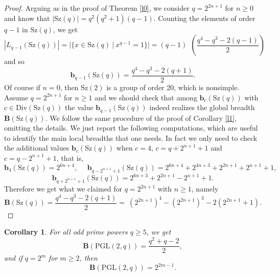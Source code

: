 \documentclass{amsart}
\newtheorem{corollary}[theorem]{Corollary}
\theoremstyle{definition}
\numberwithin{equation}{section}
\begin{document}
\begin{proof} Arguing as in the proof of Theorem \ref{l0}, we consider $q=2^{2n+1}$ for $n \ge 0$ and know that $|\mathrm{Sz}(q)|= q^2(q^2+1)(q-1)$. Counting the elements of order $q-1$ in $\mathrm{Sz}(q)$, we get
\begin{equation}
|L_{q-1}(\mathrm{Sz}(q))|=|\{x \in \mathrm{Sz}(q) \ | \ x^{q-1}=1\}|=(q-1) \ \ \left(\frac{q^4-q^3-2(q-1)}{2}\right)
\end{equation}
and so \begin{equation}\mathbf{b}_{q-1}(\mathrm{Sz}(q))=\frac{q^4-q^3-2(q+1)}{2}.
\end{equation}
Of course if $n=0$, then $\mathrm{Sz}(2)$ is a group of order 20, which is nonsimple. Assume $q=2^{2n+1}$ for $n \ge 1$ and we should check that among $\mathbf{b}_c(\mathrm{Sz}(q))$ with $c\in \mathrm{Div}(\mathrm{Sz}(q))$ the value $\mathbf{b}_{q-1}(\mathrm{Sz}(q))$ indeed realizes the global breadth $\mathbf{B}(\mathrm{Sz}(q))$. We follow the same procedure of the proof of Corollary \ref{l1}, omitting the details. We just report the following computations, which are useful to identify the main local breadths that one needs. In fact we  only need to check the additional values $\mathbf{b}_{c}(\mathrm{Sz}(q))$ when $c=4$, $c=q+2^{n+1} + 1$ and $c=q-2^{n+1} + 1$, that is, 
\begin{equation}
    \mathbf{b}_4(\mathrm{Sz}(q))=  2^{6n+4}, \ \ \ \ \ \ 
    \mathbf{b}_{q-2^{n+1}+1}(\mathrm{Sz}(q))=  2^{6n+4}+2^{4n+3}+2^{2n+1}+2^{n+1}+1,
\end{equation}  
\begin{equation}
\mathbf{b}_{q+2^{n+1} + 1}(\mathrm{Sz}(q))= 2^{6n+3}+2^{2n+1}-2^{n+1}+1.
\end{equation}
Therefore we get what we claimed for $q=2^{2n+1}$  with $n \geq 1$, namely \begin{equation}\mathbf{B}(\mathrm{Sz}(q)) = \frac{q^4-q^3-2(q+1)}{2}=\:\left(2^{2n+1}\right)^4-\left(2^{2n+1}\right)^3-2\left(2^{2n+1}+1\right).\end{equation} 
\end{proof}




\begin{corollary}\label{l3} For all odd prime powers $q \ge 5$, we get
 \begin{equation}\mathbf{B}(\mathrm{PGL}(2,q)) = \frac{q^2+q-2}{2}, 
 \end{equation} 
and if $q=2^m$ for $m\ge2$, then
 \begin{equation} \label{pgl2}
\mathbf{B}(\mathrm{PGL}(2,q)) = 2^{2m-1}. \end{equation}
\end{corollary}
\end{document}
